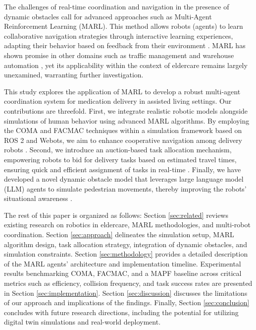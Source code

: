 \documentclass[conference]{IEEEtran}
\begin{document}
The challenges of real-time coordination and navigation in the presence of dynamic obstacles call for advanced approaches such as Multi-Agent Reinforcement Learning (MARL). This method allows robots (agents) to learn collaborative navigation strategies through interactive learning experiences, adapting their behavior based on feedback from their environment \citep{liu2023}. MARL has shown promise in other domains such as traffic management and warehouse automation \citep{yu2023}, yet its applicability within the context of eldercare remains largely unexamined, warranting further investigation.

This study explores the application of MARL to develop a robust multi-agent coordination system for medication delivery in assisted living settings. Our contributions are threefold. First, we integrate realistic robotic models alongside simulations of human behavior using advanced MARL algorithms. By employing the COMA and FACMAC techniques within a simulation framework based on ROS 2 and Webots, we aim to enhance cooperative navigation among delivery robots \citep{salinas2023}. Second, we introduce an auction-based task allocation mechanism, empowering robots to bid for delivery tasks based on estimated travel times, ensuring quick and efficient assignment of tasks in real-time \citep{kayy2017}. Finally, we have developed a novel dynamic obstacle model that leverages large language model (LLM) agents to simulate pedestrian movements, thereby improving the robots' situational awareness \citep{rostumi2019}.

The rest of this paper is organized as follows: Section \ref{sec:related} reviews existing research on robotics in eldercare, MARL methodologies, and multi-robot coordination. Section \ref{sec:approach} delineates the simulation setup, MARL algorithm design, task allocation strategy, integration of dynamic obstacles, and simulation constraints. Section \ref{sec:methodology} provides a detailed description of the MARL agents' architecture and implementation timeline. Experimental results benchmarking COMA, FACMAC, and a MAPF baseline across critical metrics such as efficiency, collision frequency, and task success rates are presented in Section \ref{sec:implementation}. Section \ref{sec:discussion} discusses the limitations of our approach and implications of the findings. Finally, Section \ref{sec:conclusion} concludes with future research directions, including the potential for utilizing digital twin simulations and real-world deployment.
\end{document}
